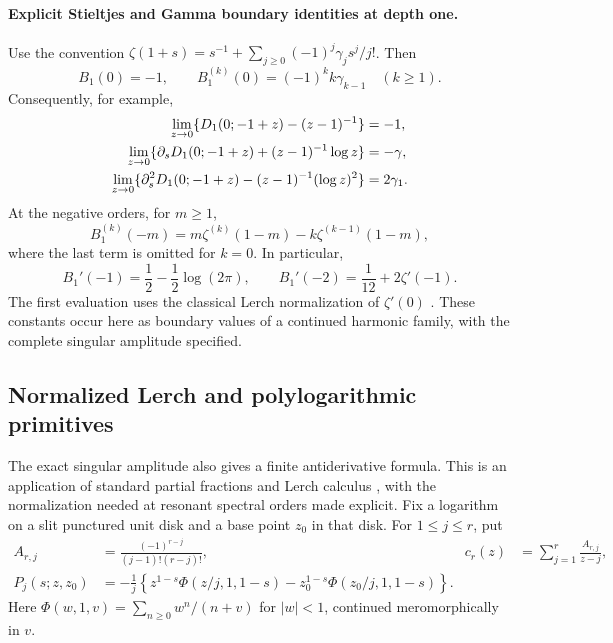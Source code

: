 \documentclass[11pt,a4paper]{article}
\numberwithin{equation}{section}
\theoremstyle{definition}
\theoremstyle{remark}
\begin{document}
\paragraph{Explicit Stieltjes and Gamma boundary identities at depth one.}
Use the convention
$\zeta(1+s)=s^{-1}+\sum_{j\geq0}(-1)^j\gamma_js^j/j!$.
Then \cite{DLMFHurwitz}
\begin{equation}\label{hsh:Stieltjes}
 B_1(0)=-1,\qquad
 B_1^{(k)}(0)=(-1)^k k\gamma_{k-1}\quad(k\geq1).
\end{equation}
Consequently, for example,
\begin{align}
 \lim_{z\to0}\{D_1(0;-1+z)-(z-1)^{-1}\}&=-1,\notag\\
 \lim_{z\to0}\{\partial_sD_1(0;-1+z)
                          +(z-1)^{-1}\log z\}&=-\gamma,\notag\\
 \lim_{z\to0}\{\partial_s^2D_1(0;-1+z)
                          -(z-1)^{-1}(\log z)^2\}&=2\gamma_1.
                                                       \label{hsh:stieltjeslimits}
\end{align}
At the negative orders, for $m\geq1$,
\begin{equation}\label{hsh:zetaexplicit}
 B_1^{(k)}(-m)=m\zeta^{(k)}(1-m)
                         -k\zeta^{(k-1)}(1-m),
\end{equation}
where the last term is omitted for $k=0$.  In particular,
\[
 B_1'(-1)=\frac12-\frac12\log(2\pi),\qquad
 B_1'(-2)=\frac1{12}+2\zeta'(-1).
\]
The first evaluation uses the classical Lerch normalization of
$\zeta'(0)$ \cite{DLMFHurwitz}.  These constants occur here as
boundary values of a continued harmonic family, with the complete
singular amplitude specified.

\subsection{Normalized Lerch and polylogarithmic primitives}
\label{hsh:primitives}

The exact singular amplitude also gives a finite antiderivative formula.
This is an application of standard partial fractions and Lerch calculus
\cite{DLMFLerch}, with the normalization needed at resonant spectral
orders made explicit.  Fix a logarithm on a slit punctured unit disk
and a base point $z_0$ in that disk.  For $1\leq j\leq r$, put
\begin{align}
 A_{r,j}&=\frac{(-1)^{r-j}}{(j-1)!(r-j)!},
 &c_r(z)&=\sum_{j=1}^{r}\frac{A_{r,j}}{z-j},
                                                    \label{hsh:primitivePF}\\
 P_j(s;z,z_0)&=-\frac1j\left\{
 z^{1-s}\Phi(z/j,1,1-s)
       -z_0^{1-s}\Phi(z_0/j,1,1-s)\right\}.
                                                    \label{hsh:Lerchprimitive}
\end{align}
Here $\Phi(w,1,v)=\sum_{n\geq0}w^n/(n+v)$ for $|w|<1$,
continued meromorphically in $v$.
\end{document}
